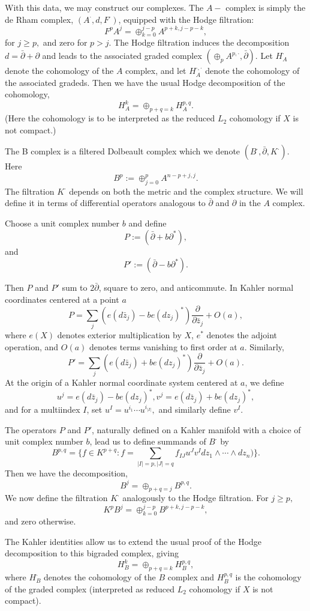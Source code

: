 \documentclass[a4paper,11pt]{amsart}
\newcommand{\db}{\bar{\partial}}
\newcommand{\p}{\partial}
\begin{document}
With this data, we may construct our complexes. 
   The $A-$ complex is simply the de Rham complex, 
$(A^{\cdot},d,F^{\cdot})$, equipped with the Hodge filtration:  
$$F^pA^j = \oplus_{k=0}^{j-p}A^{p+k,j-p-k},$$
for $j\geq p,$ and zero for $p>j$.
 The Hodge filtration induces 
the decomposition $d = \db + \p$ and leads to the associated graded complex 
$(\oplus_p A^{p,\cdot},\db).$ Let $H_A^{\cdot}$ denote the cohomology of the 
$A$ complex, and let $H^{\cdot,\cdot}_A$ denote the cohomology of the 
associated gradeds.  Then we have the usual Hodge decomposition of the
cohomology, 
$$H^k_A = \oplus_{p+q=k}H^{p,q}_A.$$
(Here the cohomology is to be interpreted as the reduced $L_2$ cohomology
 if $X$ is not compact.)
 
 
 The B complex is a filtered Dolbeault complex which we denote 
$(B^{\cdot},\db,K^{\cdot}).$ Here 
$$B^p := \oplus_{j=0}^pA^{n-p+j,j}.$$
The filtration $K^{\cdot}$ depends on 
both the metric and the complex structure. We will define it in terms of 
differential operators analogous to $\db $ and $\partial$ in the $A$ complex.

Choose a unit complex number $b$ and define 
$$P := (\db + b\p^*),$$
and 
$$P' := (\db - b\p^*).$$

Then 
$P$ and $P'$ sum to $2\db$, square to zero, and anticommute. In Kahler normal 
coordinates centered at a point $a$ 
$$P = \sum_j(e(d\bar z_j)-be(dz_j)^*)\frac{\p}{\p\bar{z}_j} + O(a),$$
where $e(X)$ denotes exterior multiplication by $X$, $e^*$ denotes the adjoint
operation, and $O(a)$ denotes terms vanishing to first order at $a$.
Similarly, 
$$P' = \sum_j(e(d\bar z_j)+be(dz_j)^*)\frac{\p}{\p\bar{z}_j} + O(a).$$
At the origin of a Kahler normal coordinate system centered at $a$, we define 
$$u^j = e(d\bar z_j)-be(dz_j)^*, v^j = e(d\bar z_j)+be(dz_j)^*, $$
and for a multiindex $I$, set $u^I = u^{i_1}\cdots u^{i_{|I|}},$ and similarly 
define $v^I$. 

The operators $P$ and $P'$, naturally defined on a Kahler manifold with a 
choice of unit complex number $b$, lead us to define summands of 
$B^{\cdot}$ by 
$$B^{p,q} = \{f\in K^{p+q}: f = \sum_{|I|=p,|J|=q}f_{IJ}u^Jv^Idz_1\wedge\cdots\wedge dz_n)\}.$$
Then we have the decomposition, 
$$B^j = \oplus_{p+q=j}B^{p,q}.$$ 
We now define the filtration $K^{\cdot}$ analogously to the Hodge filtration. 
For $j\geq p,$
$$K^pB^j = \oplus_{k=0}^{j-p}B^{p+k,j-p-k},$$ 
and zero otherwise.

 The Kahler identities allow us to extend the usual proof
of the Hodge decomposition to this bigraded complex, giving 
$$H_B^k = \oplus_{p+q=k}H^{p,q}_B,$$
where $H_B^{\cdot}$ denotes the cohomology of the $B$ complex and $H^{p,q}_B$ 
is the cohomology of the graded complex (interpreted as reduced $L_2$ cohomology
if $X$ is not compact). 
\end{document}

